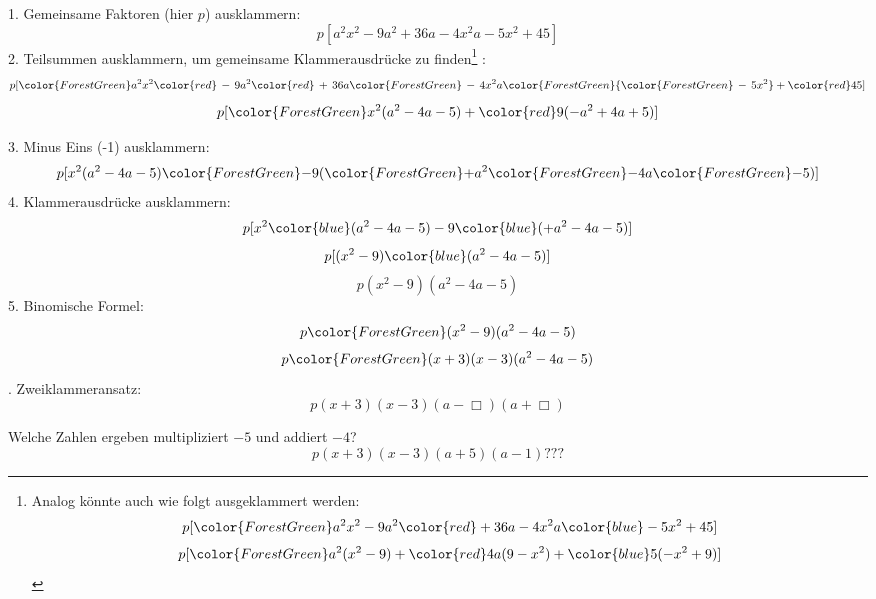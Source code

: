 
1. Gemeinsame Faktoren (hier $p$) ausklammern:
$$p[a^2x^2 - 9a^2 + 36a -4x^2a -5x^2 + 45]$$
2. Teilsummen ausklammern, um gemeinsame Klammerausdrücke zu finden\footnote{
Analog könnte auch wie folgt ausgeklammert werden:
$$p[{\color{ForestGreen}a^2x^2 -9a^2} {\color{red}+ 36a -4x^2a} {\color{blue}- 5x^2 + 45}]$$
$$p[{\color{ForestGreen}a^2}(x^2 - 9) + {\color{red}4a}(9 - x^2) + {\color{blue}5}(-x^2 + 9)]$$
}
:
$$p[{\color{ForestGreen}a^2x^2 } {\color{red}\, -\, 9a^2} {\color{red}\, +\, 36a} {\color{ForestGreen}\, -\, 4x^2a} {\color{ForestGreen} {\color{ForestGreen}\,-\,5x^2} } + {\color{red}45}]$$
$$p[{\color{ForestGreen}x^2} (a^2 -4a -5) + {\color{red}9}(-a^2 + 4a +5)]$$

3. Minus Eins (-1) ausklammern:
$$p[x^2 (a^2 -4a -5) {\color{ForestGreen}-} 9({\color{ForestGreen}+}a^2 {\color{ForestGreen}-} 4a {\color{ForestGreen}-} 5)]$$
4. Klammerausdrücke ausklammern:
$$p[x^2 {\color{blue}(a^2 -4a -5)} - 9{\color{blue}(+a^2 - 4a - 5)}]$$
$$p[(x^2-9) {\color{blue}(a^2 -4a -5)}]$$
$$p(x^2-9) (a^2 -4a -5)$$
5. Binomische Formel:
$$p{\color{ForestGreen}(x^2-9)}(a^2 -4a -5)$$
$$p{\color{ForestGreen}(x+3)(x-3)}(a^2 -4a -5)$$
. Zweiklammeransatz:
$$p(x+3)(x-3) (a-\Box{})(a+\Box{})$$

Welche Zahlen ergeben multipliziert $-5$ und addiert $-4$?
$$p(x+3)(x-3)(a+5)(a-1) ???$$
\begin{center}{}\end{center}







\newpage
